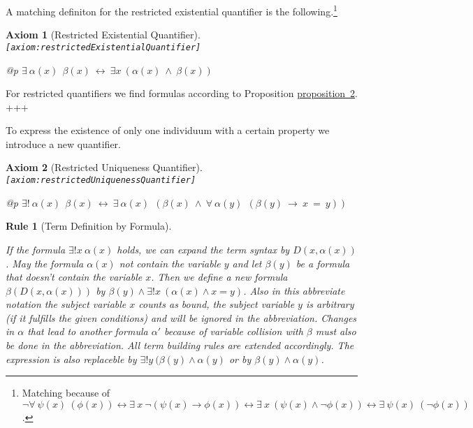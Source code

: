 \documentclass[a4paper,german,10pt,twoside]{book}
\newtheorem{ax}{Axiom}
\newtheorem{rul}{Rule}
\theoremstyle{definition}
\theoremstyle{remark}
\begin{document}
\par
A matching definiton for the restricted existential quantifier is the following.\footnote{Matching because of $\neg \forall \ \psi(x) \ (\phi(x)) \leftrightarrow \exists \ x \ \neg (\psi(x) \rightarrow \phi(x)) \leftrightarrow \exists \ x \ (\psi(x) \land \neg\phi(x)) \leftrightarrow \exists \ \psi(x) \ (\neg\phi(x))$.}

\begin{ax}[Restricted Existential Quantifier]
\label{axiom:restrictedExistentialQuantifier} \hypertarget{axiom:restrictedExistentialQuantifier}{}
{\tt \tiny [\verb]axiom:restrictedExistentialQuantifier]]}
\mbox{}
\begin{longtable}{{@{\extracolsep{\fill}}p{\linewidth}}}
\centering $\exists \ \alpha(x)\ \ \beta(x)\ \leftrightarrow\ \exists x\ (\alpha(x)\ \land\ \beta(x))$
\end{longtable}

\end{ax}


For restricted quantifiers we find formulas according to Proposition \hyperlink{theorem:predicateCalculus}{proposition~2}.
\\
+++


\par
To express the existence of only one individuum with a certain property we introduce a new quantifier.

\begin{ax}[Restricted Uniqueness Quantifier]
\label{axiom:restrictedUniquenessQuantifier} \hypertarget{axiom:restrictedUniquenessQuantifier}{}
{\tt \tiny [\verb]axiom:restrictedUniquenessQuantifier]]}
\mbox{}
\begin{longtable}{{@{\extracolsep{\fill}}p{\linewidth}}}
\centering $\exists! \ \alpha(x)\ \ \beta(x)\ \leftrightarrow\ \exists \ \alpha(x)\ \ (\beta(x)\ \land\ \forall \ \alpha(y)\ \ (\beta(y)\ \rightarrow\ x \ = \ y))$
\end{longtable}

\end{ax}


\begin{rul}[Term Definition by Formula]\hypertarget{rule:termdef}{}
If the formula $\exists! x \ \alpha(x)$ holds, we can expand the term syntax by $D(x, \alpha(x))$. May the formula $\alpha(x)$ not contain the variable $y$ and let $\beta(y)$ be a formula that doesn't contain the variable $x$. Then we define a new formula $\beta(D(x, \alpha(x)))$ by $\beta(y) \land \exists! x \ (\alpha(x) \land x = y)$. Also in this abbreviate notation the subject variable $x$ counts as bound, the subject variable $y$ is arbitrary (if it fulfills the given conditions) and will be ignored in the abbreviation. Changes in $\alpha$ that lead to another formula $\alpha'$ because of variable collision with $\beta$ must also be done in the abbreviation. All term building rules are extended accordingly. The expression is also replaceble by $\exists! y \ (\beta(y) \land \alpha(y)$ or by $\beta(y) \land \alpha(y)$.
\end{rul}
\end{document}
